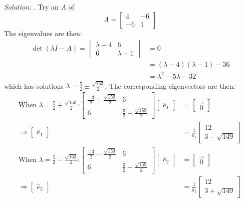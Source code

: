 \documentclass[11pt]{homework}
\begin{document}
\emph{Solution:}
.
Try an $A$ of
\begin{equation*}
A = 
  \begin{bmatrix}
  4 & -6 \\
  -6 & 1
  \end{bmatrix}
\end{equation*}
The eigenvalues are then:
\begin{align*}
\det(\lambda I -A) = 
  \begin{vmatrix}
  \lambda-4 & 6 \\
  6 & \lambda-1
  \end{vmatrix}
  &= 0 \\
  &= (\lambda -4)(\lambda -1) -36\\
  &= \lambda^2 - 5\lambda -32
\end{align*}
which has solutions $\lambda =\frac{5}{2} \pm \frac{\sqrt{153}}{2}$.
The corresponding eigenvectors are then:
\begin{align*}
\text{When $\lambda = \frac{5}{2} + \frac{\sqrt{153}}{2}$:}
  \begin{bmatrix}
  \frac{-3}{2} + \frac{\sqrt{159}}{2} & 6 \\
  6 & \frac{3}{2} + \frac{\sqrt{159}}{2}
  \end{bmatrix}
  \begin{bmatrix}
    \hat e_1
  \end{bmatrix}
  &=
  \begin{bmatrix}
   \vec 0
  \end{bmatrix} \\
  \Rightarrow
  \begin{bmatrix}
    \hat e_1
  \end{bmatrix}
  &=
  \frac{1}{k_1}
  \begin{bmatrix}
    12 \\
    3 - \sqrt{149}
  \end{bmatrix} \\
\text{When $\lambda = \frac{5}{2} - \frac{\sqrt{153}}{2}$:}
  \begin{bmatrix}
  \frac{-3}{2} - \frac{\sqrt{159}}{2} & 6 \\
  6 & \frac{3}{2} - \frac{\sqrt{159}}{2}
  \end{bmatrix}
  \begin{bmatrix}
    \hat e_2
  \end{bmatrix}
  &=
  \begin{bmatrix}
   \vec 0
  \end{bmatrix} \\
  \Rightarrow
  \begin{bmatrix}
    \hat e_2
  \end{bmatrix}
  &=
  \frac{1}{k_2}
  \begin{bmatrix}
    12 \\
    3 + \sqrt{149}
  \end{bmatrix}
\end{align*}
\end{document}
